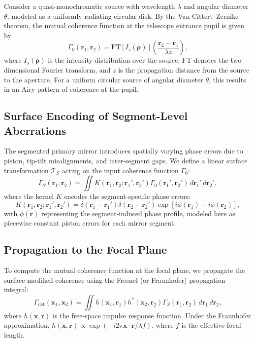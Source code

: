 \documentclass[a4paper,12pt]{article}
\begin{document}
Consider a quasi-monochromatic source with wavelength $\lambda$ and angular diameter $\theta$, modeled as a uniformly radiating circular disk. By the Van Cittert–Zernike theorem, the mutual coherence function at the telescope entrance pupil is given by
\begin{equation}
\Gamma_0(\bm{r}_1, \bm{r}_2) = \mathrm{FT}\left[ I_s(\bm{\rho}) \right] \left( \frac{\bm{r}_2 - \bm{r}_1}{\lambda z} \right),
\label{eq:mutual_coherence}
\end{equation}
where $I_s(\bm{\rho})$ is the intensity distribution over the source, $\mathrm{FT}$ denotes the two-dimensional Fourier transform, and $z$ is the propagation distance from the source to the aperture. For a uniform circular source of angular diameter $\theta$, this results in an Airy pattern of coherence at the pupil.

\subsection{Surface Encoding of Segment-Level Aberrations}

The segmented primary mirror introduces spatially varying phase errors due to piston, tip-tilt misalignments, and inter-segment gaps. We define a linear surface transformation $\mathcal{T}_S$ acting on the input coherence function $\Gamma_0$:
\begin{equation}
\Gamma_S(\bm{r}_1, \bm{r}_2) = \iint K(\bm{r}_1, \bm{r}_2; \bm{r}_1', \bm{r}_2') \Gamma_0(\bm{r}_1', \bm{r}_2') \, d\bm{r}_1' \, d\bm{r}_2',
\end{equation}
where the kernel $K$ encodes the segment-specific phase errors:
\begin{equation}
K(\bm{r}_1, \bm{r}_2; \bm{r}_1', \bm{r}_2') = \delta(\bm{r}_1 - \bm{r}_1') \delta(\bm{r}_2 - \bm{r}_2') \exp\left[ i \phi(\bm{r}_1) - i \phi(\bm{r}_2) \right],
\end{equation}
with $\phi(\bm{r})$ representing the segment-induced phase profile, modeled here as piecewise constant piston errors for each mirror segment.

\subsection{Propagation to the Focal Plane}

To compute the mutual coherence function at the focal plane, we propagate the surface-modified coherence using the Fresnel (or Fraunhofer) propagation integral:
\begin{equation}
\Gamma_{\text{det}}(\bm{x}_1, \bm{x}_2) = \iint h(\bm{x}_1, \bm{r}_1) h^*(\bm{x}_2, \bm{r}_2) \Gamma_S(\bm{r}_1, \bm{r}_2) \, d\bm{r}_1 \, d\bm{r}_2,
\end{equation}
where $h(\bm{x}, \bm{r})$ is the free-space impulse response function. Under the Fraunhofer approximation, $h(\bm{x}, \bm{r}) \propto \exp(-i 2\pi \bm{x} \cdot \bm{r} / \lambda f)$, where $f$ is the effective focal length.
\end{document}
